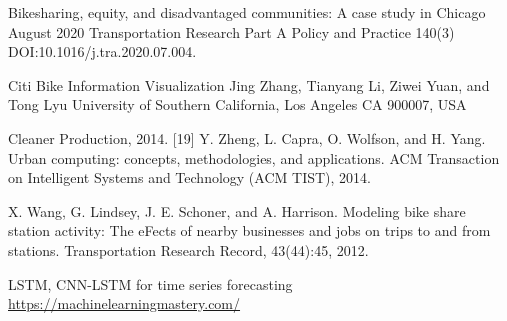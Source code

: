 \documentclass[journal]{vgtc}                     %
\begin{document}
\begin{thebibliography}{9}
Bikesharing, equity, and disadvantaged communities: A case study in Chicago August 2020 Transportation Research Part A Policy and Practice 140(3) DOI:10.1016/j.tra.2020.07.004.

Citi Bike Information Visualization Jing Zhang, Tianyang Li, Ziwei Yuan, and Tong Lyu University of Southern California, Los Angeles CA 900007, USA  

Cleaner Production, 2014. [19] Y. Zheng, L. Capra, O. Wolfson, and H. Yang. Urban computing: concepts, methodologies, and applications. ACM Transaction on Intelligent Systems and Technology (ACM TIST), 2014.

X. Wang, G. Lindsey, J. E. Schoner, and A. Harrison. Modeling bike share station activity: The eFects of nearby businesses and jobs on trips to and from stations. Transportation Research Record, 43(44):45, 2012.


LSTM, CNN-LSTM for time series forecasting
\href{https://machinelearningmastery.com/how-to-get-started-with-deep-learning-for-time-series-forecasting-7-day-mini-course/}{https://machinelearningmastery.com/}




\end{thebibliography}
\end{document}
